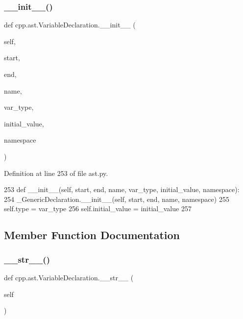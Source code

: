 \subsubsection{\texorpdfstring{\+\_\+\+\_\+init\+\_\+\+\_\+()}{\_\_init\_\_()}}
{\footnotesize\ttfamily def cpp.\+ast.\+Variable\+Declaration.\+\_\+\+\_\+init\+\_\+\+\_\+ (\begin{DoxyParamCaption}\item[{}]{self,  }\item[{}]{start,  }\item[{}]{end,  }\item[{}]{name,  }\item[{}]{var\+\_\+type,  }\item[{}]{initial\+\_\+value,  }\item[{}]{namespace }\end{DoxyParamCaption})}



Definition at line 253 of file ast.\+py.


\begin{DoxyCode}
253     \textcolor{keyword}{def }\_\_init\_\_(self, start, end, name, var\_type, initial\_value, namespace):
254         \_GenericDeclaration.\_\_init\_\_(self, start, end, name, namespace)
255         self.type = var\_type
256         self.initial\_value = initial\_value
257 
\end{DoxyCode}


\subsection{Member Function Documentation}
\mbox{\label{classcpp_1_1ast_1_1VariableDeclaration_a9f5c15731d1bdd8fe14c2a575e2f4fe6}} 
\subsubsection{\texorpdfstring{\+\_\+\+\_\+str\+\_\+\+\_\+()}{\_\_str\_\_()}}
{\footnotesize\ttfamily def cpp.\+ast.\+Variable\+Declaration.\+\_\+\+\_\+str\+\_\+\+\_\+ (\begin{DoxyParamCaption}\item[{}]{self }\end{DoxyParamCaption})}



